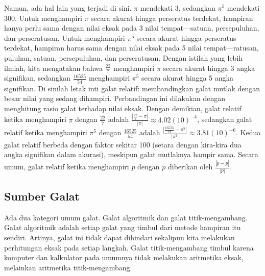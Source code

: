 Namun, ada hal lain yang terjadi di sini. $\pi$ mendekati 3, sedangkan
$\pi^{5}$ mendekati 300. Untuk menghampiri $\pi$ secara akurat hingga
perseratus terdekat, hampiran hanya perlu sama dengan nilai eksak
pada 3 nilai tempat---satuan, persepuluhan, dan perseratusan. Untuk
menghampiri $\pi^{5}$ secara akurat hingga perseratus terdekat, hampiran
harus sama dengan nilai eksak pada 5 nilai tempat---ratusan, puluhan,
satuan, persepuluhan, dan perseratusan. Dengan istilah yang lebih
ilmiah, kita mengatakan bahwa $\frac{22}{7}$ menghampiri $\pi$ secara
akurat hingga 3 angka signifikan, sedangkan $\frac{16525}{54}$ menghampiri
$\pi^{5}$ secara akurat hingga 5 angka signifikan. Di sinilah letak
inti galat relatif: membandingkan galat mutlak dengan besar nilai
yang sedang dihampiri. Perbandingan ini dilakukan dengan menghitung
rasio galat terhadap nilai eksak. Dengan demikian, galat relatif ketika
menghampiri $\pi$ dengan $\frac{22}{7}$ adalah ${\displaystyle \frac{|\frac{22}{7}-\pi|}{|\pi|}\approx4.02(10)^{-4}}$,
sedangkan galat relatif ketika menghampiri $\pi^{5}$ dengan $\frac{16525}{54}$
adalah ${\displaystyle \frac{|\frac{16525}{54}-\pi^{5}|}{|\pi^{5}|}\approx3.81(10)^{-6}}$.
Kedua galat relatif berbeda dengan faktor sekitar 100 (setara dengan
kira-kira dua angka signifikan dalam akurasi), meskipun galat mutlaknya
hampir sama. Secara umum, galat relatif ketika
menghampiri $p$ dengan $\tilde{p}$ diberikan oleh ${\displaystyle \frac{|\tilde{p}-p|}{|p|}}$.

\subsection{Sumber Galat}

Ada dua kategori umum galat. Galat algoritmik
dan galat titik-mengambang. Galat algoritmik
adalah setiap galat yang timbul dari metode hampiran itu sendiri.
Artinya, galat ini tidak dapat dihindari sekalipun kita melakukan
perhitungan eksak pada setiap langkah. Galat titik-mengambang timbul
karena komputer dan kalkulator pada umumnya tidak melakukan aritmetika
eksak, melainkan aritmetika titik-mengambang.

